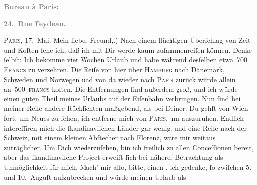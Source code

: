 \begin{ledgroupsized}[t]{13cm}
           \pstart
           \begin{otherlanguage}{french}\textcolor{gray}{\textbf{\textbf{Bureau à Paris:}}}\end{otherlanguage}\pend
           \pstart
           \begin{otherlanguage}{french}\textcolor{gray}{\textbf{\textbf{24. Rue Feydeau.}}}\end{otherlanguage}\hfill \textsc{Paris}, 17. Mai.\pend
           \pstart\center{}Mein lieber Freund,\pend{}.) Nach einem flüchtigen Überſchlag von Zeit und Koſten ſehe ich, daß ich mit Dir
               werde kaum zuſammenreiſen können. Denke ſelbſt: Ich bekomme vier Wochen Urlaub und
               habe während desſelben etwa 700 \textsc{Francs} zu verzehren. Die
               Reiſe von hier über \textsc{Hamburg} nach Dänemark, Schweden und Norwegen und von da wieder nach \textsc{Paris} zurück würde allein an 500 \textsc{francs} koſten. Die
               Entfernungen {\pb}ſind außerdem groß, und ich würde
               einen guten Theil meines Urlaubs auf der Eiſenbahn verbringen. Nun ſind bei meiner
               Reiſe andere Rückſichten maßgebend, als bei Deiner. Du gehſt von Wien fort, um Neues zu ſehen, ich entferne mich von \textsc{Paris}, um auszuruhen. Endlich intereſſiren mich die ſkandinaviſchen Länder gar wenig, und eine Reiſe nach der Schweiz, mit einem kleinen Abſtecher nach Florenz, wäre mir weitaus zuträglicher. Um Dich wiederzuſehen,
               bin ich freilich zu allen Conceſſionen {\pb}bereit, aber
               das ſkandinaviſche Project erweiſt ſich bei näherer Betrachtung als
               Unmöglichkeit für mich. Mach’ mir alſo, bitte, einen \label{K_L02774-1v}\label{K_L02774-1h}. Ich gedenke, ſo zwiſchen 5. und 10. Auguſt aufzubrechen und würde meinen Urlaub als

\end{ledgroupsized}
